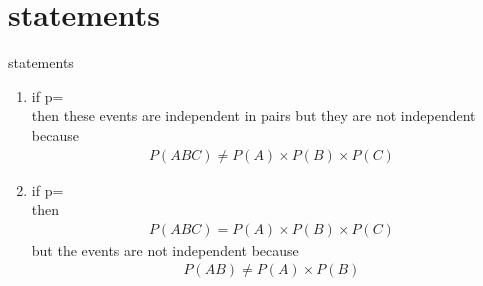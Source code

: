 \documentclass{beamer}
\begin{document}
\section{statements}
\begin{frame}{statements}
   \begin{enumerate}[label=\Alph*]
       \item 
       if p=\\\vspace{2mm} then these events are independent in pairs but they are not independent because
    \begin{align}
          P(ABC)\neq P(A)\times P(B)\times P(C)\nonumber
    \end{align}
    
      \item
      if p=\\\vspace{2mm} then 
      \begin{align}
          P(ABC)=P(A)\times P(B)\times P(C)\nonumber
      \end{align}
      but the events are not independent because 
      \begin{align}
          P(AB)\neq P(A)\times P(B)\nonumber
      \end{align}
    
   \end{enumerate}

\end{frame} 
\end{document}
